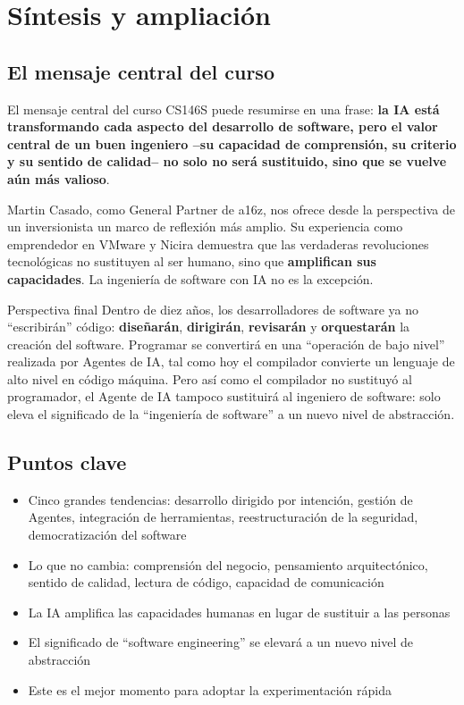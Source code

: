 \section{Síntesis y ampliación}

\subsection{El mensaje central del curso}

El mensaje central del curso CS146S puede resumirse en una frase: \textbf{la IA está transformando cada aspecto del desarrollo de software, pero el valor central de un buen ingeniero --su capacidad de comprensión, su criterio y su sentido de calidad-- no solo no será sustituido, sino que se vuelve aún más valioso}.

Martin Casado, como General Partner de a16z, nos ofrece desde la perspectiva de un inversionista un marco de reflexión más amplio. Su experiencia como emprendedor en VMware y Nicira demuestra que las verdaderas revoluciones tecnológicas no sustituyen al ser humano, sino que \textbf{amplifican sus capacidades}. La ingeniería de software con IA no es la excepción.

\begin{importantbox}{Perspectiva final}
Dentro de diez años, los desarrolladores de software ya no ``escribirán'' código: \textbf{diseñarán}, \textbf{dirigirán}, \textbf{revisarán} y \textbf{orquestarán} la creación del software. Programar se convertirá en una ``operación de bajo nivel'' realizada por Agentes de IA, tal como hoy el compilador convierte un lenguaje de alto nivel en código máquina. Pero así como el compilador no sustituyó al programador, el Agente de IA tampoco sustituirá al ingeniero de software: solo eleva el significado de la ``ingeniería de software'' a un nuevo nivel de abstracción.
\end{importantbox}

\subsection{Puntos clave}

\begin{itemize}
    \item Cinco grandes tendencias: desarrollo dirigido por intención, gestión de Agentes, integración de herramientas, reestructuración de la seguridad, democratización del software
    \item Lo que no cambia: comprensión del negocio, pensamiento arquitectónico, sentido de calidad, lectura de código, capacidad de comunicación
    \item La IA amplifica las capacidades humanas en lugar de sustituir a las personas
    \item El significado de ``software engineering'' se elevará a un nuevo nivel de abstracción
    \item Este es el mejor momento para adoptar la experimentación rápida
\end{itemize}

